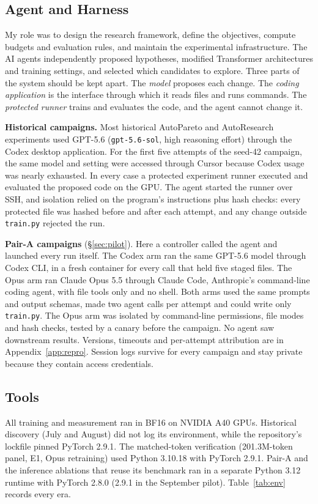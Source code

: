 \documentclass{article}
\newif\ifshowhumanmarkers \showhumanmarkersfalse
\newcommand{\humantag}[1]{{\color{humanframe}\sffamily\scriptsize\bfseries HUMAN AUTHOR MUST REWRITE/VERIFY [#1]}\ }
\newcommand{\humanauthor}[2][]{\ifshowhumanmarkers\begin{humanbox}\humantag{#1}#2\end{humanbox}\else #2\par\fi}
\begin{document}
\subsection{Agent and Harness}\label{sec:agent}
\humanauthor[P2-02 r6]{My role was to design the research framework, define the objectives, compute budgets and evaluation rules, and maintain the experimental infrastructure. The AI agents independently proposed hypotheses, modified Transformer architectures and training settings, and selected which candidates to explore. Three parts of the system should be kept apart. The \emph{model} proposes each change. The \emph{coding application} is the interface through which it reads files and runs commands. The \emph{protected runner} trains and evaluates the code, and the agent cannot change it.

\textbf{Historical campaigns.} Most historical AutoPareto and AutoResearch experiments used GPT-5.6 (\texttt{gpt-5.6-sol}, high reasoning effort) through the Codex desktop application. For the first five attempts of the seed-42 campaign, the same model and setting were accessed through Cursor because Codex usage was nearly exhausted. In every case a protected experiment runner executed and evaluated the proposed code on the GPU. The agent started the runner over SSH, and isolation relied on the program's instructions plus hash checks: every protected file was hashed before and after each attempt, and any change outside \texttt{train.py} rejected the run.

\textbf{Pair-A campaigns} (\S\ref{sec:pilot}). Here a controller called the agent and launched every run itself. The Codex arm ran the same GPT-5.6 model through Codex CLI, in a fresh container for every call that held five staged files. The Opus arm ran Claude Opus 5.5 through Claude Code, Anthropic's command-line coding agent, with file tools only and no shell. Both arms used the same prompts and output schemas, made two agent calls per attempt and could write only \texttt{train.py}. The Opus arm was isolated by command-line permissions, file modes and hash checks, tested by a canary before the campaign. No agent saw downstream results. Versions, timeouts and per-attempt attribution are in Appendix~\ref{app:repro}. Session logs survive for every campaign and stay private because they contain access credentials.}

\subsection{Tools}
\humanauthor[P2-03 r6]{All training and measurement ran in BF16 on NVIDIA A40 GPUs. Historical discovery (July and August) did not log its environment, while the repository's lockfile pinned PyTorch 2.9.1. The matched-token verification (201.3M-token panel, E1, Opus retraining) used Python 3.10.18 with PyTorch 2.9.1. Pair-A and the inference ablations that reuse its benchmark ran in a separate Python 3.12 runtime with PyTorch 2.8.0 (2.9.1 in the September pilot). Table~\ref{tab:env} records every era.}
\end{document}
